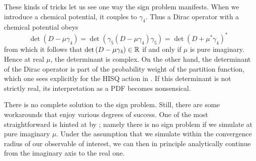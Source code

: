 These kinds of tricks let us see one way the sign problem manifests.
When we introduce a chemical potential, it couples to $\gamma_4$.
Thus a Dirac operator with a chemical potential obeys
\begin{equation}\label{eq:signproblem}
\det\left(D-\mu\gamma_4\right)
=\det\left(\gamma_5\left(D-\mu\gamma_4\right)\gamma_5\right)
=\det\left(D+\mu^*\gamma_4\right)^*
\end{equation}
from which it follows that
$\det\left(D-\mu\gamma_4\right)\in\mathbb{R}$ if and only if $\mu$
is pure imaginary. Hence at real $\mu$, the determinant
is complex. On the other hand, the determinant of the
Dirac operator is part of the probability weight
of the partition function, which one sees explicitly for
the HISQ action in . If this
determinant is not strictly real, its interpretation
as a PDF becomes nonsensical.

There is no complete solution to the sign problem. Still, there are
some workarounds that enjoy various degrees of success.
One of the most straightforward is hinted at by
; namely there is no sign problem
if we simulate at pure imaginary $\mu$. Under the assumption
that we simulate within the convergence radius of our
observable of interest, we can then in principle analytically
continue from the imaginary axis to the real one.

